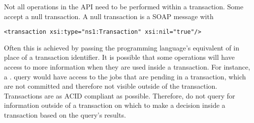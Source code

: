 

Not all operations in the API need to be performed within a
transaction.
Some accept a null transaction.
A null transaction is a SOAP message with
\begin{verbatim}
<transaction xsi:type="ns1:Transaction" xsi:nil="true"/> 
\end{verbatim}
Often this is achieved by passing the programming
language's equivalent of \verb@null@ in place of a transaction identifier.
It is possible that some operations will have access to more
information when they are used inside a transaction. For instance, a
.
query would have access to the jobs that are pending in a
transaction, which are not committed and therefore not visible
outside of the transaction. 
Transactions are as ACID compliant as possible. 
Therefore, do not query for information
outside of a transaction on which to make a decision inside a
transaction based on the query's results.


